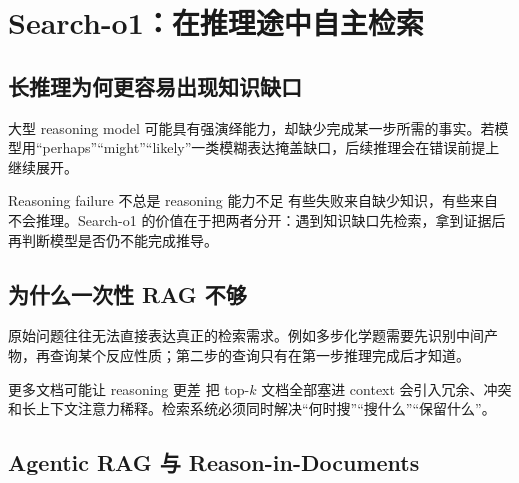 \section{Search-o1：在推理途中自主检索}

\subsection{长推理为何更容易出现知识缺口}



大型 reasoning model 可能具有强演绎能力，却缺少完成某一步所需的事实。若模型用“perhaps”“might”“likely”一类模糊表达掩盖缺口，后续推理会在错误前提上继续展开。

\begin{importantbox}{Reasoning failure 不总是 reasoning 能力不足}
有些失败来自缺少知识，有些来自不会推理。Search-o1 的价值在于把两者分开：遇到知识缺口先检索，拿到证据后再判断模型是否仍不能完成推导。
\end{importantbox}

\subsection{为什么一次性 RAG 不够}


原始问题往往无法直接表达真正的检索需求。例如多步化学题需要先识别中间产物，再查询某个反应性质；第二步的查询只有在第一步推理完成后才知道。

\begin{warningbox}{更多文档可能让 reasoning 更差}
把 top-$k$ 文档全部塞进 context 会引入冗余、冲突和长上下文注意力稀释。检索系统必须同时解决“何时搜”“搜什么”“保留什么”。
\end{warningbox}

\subsection{Agentic RAG 与 Reason-in-Documents}


